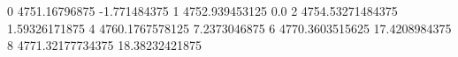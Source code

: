 0 4751.16796875 -1.771484375
1 4752.939453125 0.0
2 4754.53271484375 1.59326171875
4 4760.1767578125 7.2373046875
6 4770.3603515625 17.4208984375
8 4771.32177734375 18.38232421875
